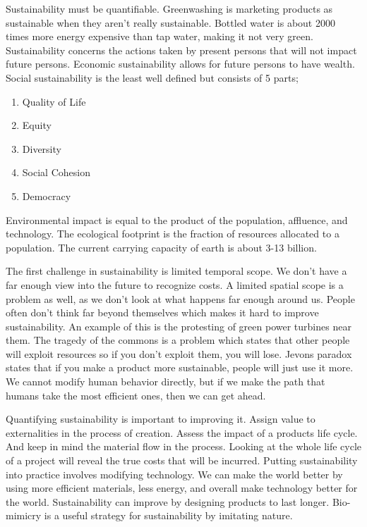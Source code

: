 \documentclass[12pt,a4paper]{report}
\begin{document}
    
    Sustainability must be quantifiable. Greenwashing is marketing products as sustainable when they aren’t really sustainable. Bottled water is about 2000 times more energy expensive than tap water, making it not very green. Sustainability concerns the actions taken by present persons that will not impact future persons. Economic sustainability allows for future persons to have wealth. Social sustainability is the least well defined but consists of 5 parts;
    
    \begin{enumerate}
        \item Quality of Life
        \item Equity
        \item Diversity
        \item Social Cohesion
        \item Democracy
    \end{enumerate}
    
    Environmental impact is equal to the product of the population, affluence, and technology. The ecological footprint is the fraction of resources allocated to a population. The current carrying capacity of earth is about 3-13 billion. 
    \par
    
    The first challenge in sustainability is limited temporal scope. We don’t have a far enough view into the future to recognize costs. A limited spatial scope is a problem as well, as we don’t look at what happens far enough around us. People often don’t think far beyond themselves which makes it hard to improve sustainability. An example of this is the protesting of green power turbines near them. The tragedy of the commons is a problem which states that other people will exploit resources so if you don’t exploit them, you will lose. Jevons paradox states that if you make a product more sustainable, people will just use it more. We cannot modify human behavior directly, but if we make the path that humans take the most efficient ones, then we can get ahead.
    \par
    Quantifying sustainability is important to improving it. Assign value to externalities in the process of creation. Assess the impact of a products life cycle. And keep in mind the material flow in the process. Looking at the whole life cycle of a project will reveal the true costs that will be incurred. Putting sustainability into practice involves modifying technology. We can make the world better by using more efficient materials, less energy, and overall make technology better for the world. Sustainability can improve by designing products to last longer. Bio-mimicry is a useful strategy for sustainability by imitating nature. 
    
\end{document}
